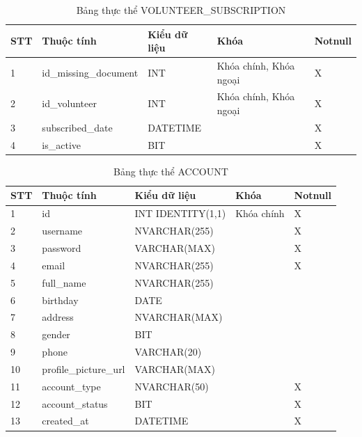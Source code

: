\documentclass[../DoAn.tex]{subfiles}
\begin{document}
\begin{table}[H]
	\centering{}
	\begin{tabular}{m{1cm} m{4cm} m{3.5cm} m{3cm} m{1.5cm}}
		\hline
		\textbf{STT} & \textbf{Thuộc tính}   & \textbf{Kiểu dữ liệu} & \textbf{Khóa}          & \textbf{Notnull}
		\\ \hline
		1            & id\_missing\_document & INT                   & Khóa chính, Khóa ngoại & X
		\\ \hline
		2            & id\_volunteer         & INT                   & Khóa chính, Khóa ngoại & X
		\\ \hline
		3            & subscribed\_date      & DATETIME              &                        & X
		\\ \hline
		4            & is\_active            & BIT                   &                        & X
		\\ \hline
	\end{tabular}
	\caption{Bảng thực thể VOLUNTEER\_SUBSCRIPTION}
\end{table}

\begin{table}[H]
	\centering{}
	\begin{tabular}{m{1cm} m{4cm} m{3.5cm} m{3cm} m{1.5cm}}
		\hline
		\textbf{STT} & \textbf{Thuộc tính}   & \textbf{Kiểu dữ liệu} & \textbf{Khóa} & \textbf{Notnull}
		\\ \hline
		1            & id                    & INT IDENTITY(1,1)     & Khóa chính    & X
		\\ \hline
		2            & username              & NVARCHAR(255)         &               & X
		\\ \hline
		3            & password              & VARCHAR(MAX)          &               & X
		\\ \hline
		4            & email                 & NVARCHAR(255)         &               & X
		\\ \hline
		5            & full\_name            & NVARCHAR(255)         &               &
		\\ \hline
		6            & birthday              & DATE                  &               &
		\\ \hline
		7            & address               & NVARCHAR(MAX)         &               &
		\\ \hline
		8            & gender                & BIT                   &               &
		\\ \hline
		9            & phone                 & VARCHAR(20)           &               &
		\\ \hline
		10           & profile\_picture\_url & VARCHAR(MAX)          &               &
		\\ \hline
		11           & account\_type         & NVARCHAR(50)          &               & X
		\\ \hline
		12           & account\_status       & BIT                   &               & X
		\\ \hline
		13           & created\_at           & DATETIME              &               & X
		\\ \hline
	\end{tabular}
	\caption{Bảng thực thể ACCOUNT}
\end{table}
\end{document}
